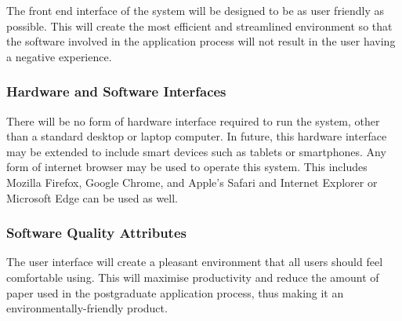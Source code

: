 \documentclass[journal]{IEEEtran}
\begin{document}
The front end interface of the system will be designed to be as user friendly as possible. This will create the most efficient and streamlined environment so that the software involved in the application process will not result in the user having a negative experience.
\hfill \break \subsubsection{Hardware and Software Interfaces }
There will be no form of hardware interface required to run the system, other than a standard desktop or laptop computer. In future, this hardware interface may be extended to include smart devices such as tablets or smartphones. Any form of internet browser may be used to operate this system. This includes Mozilla Firefox, Google Chrome, and Apple's Safari and Internet Explorer or Microsoft Edge can be used as well. 
\hfill \break \subsubsection{Software Quality Attributes}
The user interface will create a pleasant environment that all users should feel comfortable using. This will maximise productivity and reduce the amount of paper used in the postgraduate application process, thus making it an environmentally-friendly product.

\end{document}
